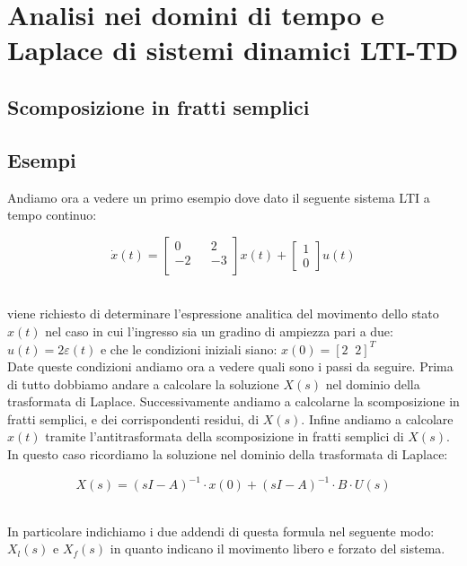 \documentclass[../main.tex]{subfiles}
\begin{document}
\clearpage
\thispagestyle{empty}
\vspace*{7cm}
\section{Analisi nei domini di tempo e Laplace di sistemi dinamici LTI-TD}
\vspace*{1.5cm}



\subsection{Scomposizione in fratti semplici}

\subsection{Esempi}

Andiamo ora a vedere un primo esempio dove dato il seguente sistema LTI a tempo continuo:

\[ \dot{x}(t) =  \begin{bmatrix} 0 && 2 \\ -2 && -3 \\ \end{bmatrix}  x(t) + \begin{bmatrix}
	1 \\ 0 \end{bmatrix} u(t)  \]\ 
	
	
	
viene richiesto di determinare l'espressione analitica del movimento dello stato $x(t)$ nel caso in cui l'ingresso sia un gradino di ampiezza pari a due: $u(t) = 2 \varepsilon(t)$ e che le condizioni iniziali siano: $x(0) = [2\;\;2]^T$\\

Date queste condizioni andiamo ora a vedere quali sono i passi da seguire. Prima di tutto dobbiamo andare a calcolare la soluzione $X(s)$ nel dominio della trasformata di Laplace. Successivamente andiamo a calcolarne la scomposizione in fratti semplici, e dei corrispondenti residui, di $X(s)$. Infine andiamo a calcolare $x(t)$ tramite l'antitrasformata della scomposizione in fratti semplici di $X(s)$.\\

In questo caso ricordiamo la soluzione nel dominio della trasformata di Laplace:

\[X(s) = (sI - A)^{-1} \cdot x(0) + (sI - A)^{-1} \cdot B \cdot U(s) \]\

In particolare indichiamo i due addendi di questa formula nel seguente modo: $X_l(s)$ e $X_f(s)$ in quanto indicano il movimento libero e forzato del sistema.\\
\end{document}
